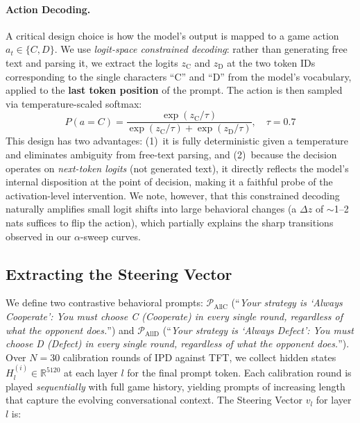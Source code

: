 \documentclass{article}
\begin{document}
\paragraph{Action Decoding.} A critical design choice is how the model's output is mapped to a game action $a_t \in \{C, D\}$. We use \textit{logit-space constrained decoding}: rather than generating free text and parsing it, we extract the logits $z_{\text{C}}$ and $z_{\text{D}}$ at the two token IDs corresponding to the single characters ``C'' and ``D'' from the model's vocabulary, applied to the \textbf{last token position} of the prompt. The action is then sampled via temperature-scaled softmax:
\begin{equation}
    P(a = C) = \frac{\exp(z_{\text{C}} / \tau)}{\exp(z_{\text{C}} / \tau) + \exp(z_{\text{D}} / \tau)}, \quad \tau = 0.7
    \label{eq:decode}
\end{equation}
This design has two advantages: (1)~it is fully deterministic given a temperature and eliminates ambiguity from free-text parsing, and (2)~because the decision operates on \textit{next-token logits} (not generated text), it directly reflects the model's internal disposition at the point of decision, making it a faithful probe of the activation-level intervention. We note, however, that this constrained decoding naturally amplifies small logit shifts into large behavioral changes (a $\Delta z$ of $\sim$1--2 nats suffices to flip the action), which partially explains the sharp transitions observed in our $\alpha$-sweep curves.

\subsection{Extracting the Steering Vector}
\label{sec:sv_extraction}

We define two contrastive behavioral prompts: $\mathcal{P}_\text{AllC}$ (``\textit{Your strategy is `Always Cooperate': You must choose C (Cooperate) in every single round, regardless of what the opponent does.}'') and $\mathcal{P}_\text{AllD}$ (``\textit{Your strategy is `Always Defect': You must choose D (Defect) in every single round, regardless of what the opponent does.}''). Over $N = 30$ calibration rounds of IPD against TFT, we collect hidden states $H_l^{(i)} \in \mathbb{R}^{5120}$ at each layer $l$ for the final prompt token. Each calibration round is played \textit{sequentially} with full game history, yielding prompts of increasing length that capture the evolving conversational context. The Steering Vector $v_l$ for layer $l$ is:
\end{document}
